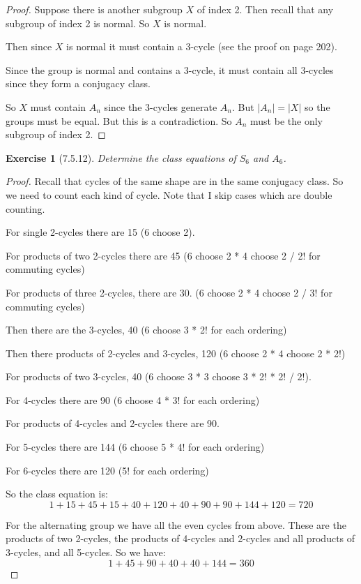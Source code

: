 \documentclass[12pt]{article}
\newtheorem*{exer}{Exercise}
\begin{document}
\begin{proof}

    Suppose there is another subgroup $X$ of index 2. Then recall that
    any subgroup of index 2 is normal. So $X$ is normal.

    Then since $X$ is normal it must contain a 3-cycle (see the proof on
    page 202). 

    Since the group is normal and contains a 3-cycle, it must contain
    all 3-cycles since they form a conjugacy class. 

    So $X$ must contain $A_n$ since the 3-cycles generate $A_n$. But
    $|A_n| = |X|$ so the groups must be equal. But this is a
    contradiction. So $A_n$ must be the only subgroup of index 2.

\end{proof}


\begin{exer}[7.5.12]

    Determine the class equations of $S_6$ and $A_6$.

\end{exer}

\begin{proof}

    Recall that cycles of the same shape are in the same conjugacy
    class. So we need to count each kind of cycle. Note that I skip
    cases which are double counting.

    For single 2-cycles there are 15 (6 choose 2).

    For products of two 2-cycles there are 45 (6 choose 2 * 4 choose 2 /
    2! for commuting cycles)

    For products of three 2-cycles, there are 30. (6 choose 2 * 4 choose
    2 / 3! for commuting cycles)

    Then there are the 3-cycles, 40 (6 choose 3 * 2! for each ordering)

    Then there products of 2-cycles and 3-cycles, 120 (6 choose 2 * 4
    choose 2 * 2!)

    For products of two 3-cycles, 40 (6 choose 3 * 3 choose 3 * 2! * 2!
    / 2!).

    For 4-cycles there are 90 (6 choose 4 * 3! for each ordering)

    For products of 4-cycles and 2-cycles there are 90.

    For 5-cycles there are 144 (6 choose 5 * 4! for each ordering)

    For 6-cycles there are 120 (5! for each ordering)

    So the class equation is:
    \[
        1 + 15 + 45 + 15 + 40 + 120 + 40 + 90 + 90 + 144 + 120 = 720
    \]

    For the alternating group we have all the even cycles from above.
    These are the products of two 2-cycles, the products of 4-cycles and
    2-cycles and all products of 3-cycles, and all 5-cycles. So we have:
    \[
        1 + 45 + 90 + 40 + 40 + 144 = 360
    \]

\end{proof}
\end{document}
